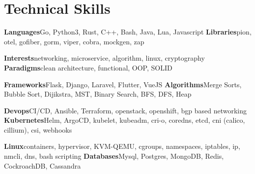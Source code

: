\section{Technical Skills}

\cvdoubleitem
  {\textbf{Languages}}{Go, Python3, Rust, C++, Bash, Java, Lua, Javascript}
  {\textbf{Libraries}}{pion, otel, gofiber, gorm, viper, cobra, mockgen, zap}

\cvdoubleitem
  {\textbf{Interests}}{networking, microservice, algorithm, linux, cryptography}
  {\textbf{Paradigms}}{clean architecture, functional, OOP, SOLID}

\cvdoubleitem
  {\textbf{Frameworks}}{Flask, Django, Laravel, Flutter, VueJS}
  {\textbf{Algorithms}}{Merge Sorts, Bubble Sort, Dijikstra, MST, Binary Search, BFS, DFS, Heap}

\cvdoubleitem
  {\textbf{Devops}}{CI/CD, Ansible, Terraform, openstack, openshift, bgp based networking}
  {\textbf{Kubernetes}}{Helm, ArgoCD, kubelet, kubeadm, cri-o, coredns, etcd, cni (calico, cillium), csi, webhooks}

\cvdoubleitem
  {\textbf{Linux}}{containers, hypervisor, KVM-QEMU, cgroups, namespaces, iptables, ip, nmcli, dns, bash scripting}
  {\textbf{Databases}}{Mysql, Postgres, MongoDB, Redis, CockroachDB, Cassandra}
